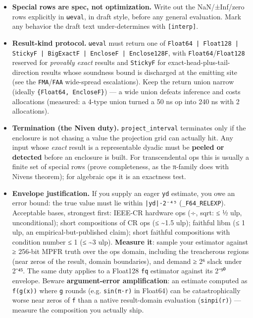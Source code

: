 \begin{itemize}
\item[1. ] \textbf{Special rows are spec, not optimization.} Write out the NaN/±Inf/zero rows explicitly in \texttt{ωeval}, in draft style, before any general evaluation. Mark any behavior the draft text under-determines with \texttt{[interp]}.


\item[2. ] \textbf{Result-kind protocol.} \texttt{ωeval} must return one of \texttt{Float64 | Float128 | StickyF | BigExactF | EncloseF | Enclose128F}, with \texttt{Float64}/\texttt{Float128} reserved for \emph{provably exact} results and \texttt{StickyF} for exact-head-plus-tail-direction results whose soundness bound is discharged at the emitting site (see the \texttt{FMA}/\texttt{FAA} wide-spread escalations). Keep the return union narrow (ideally \texttt{\{Float64, EncloseF\}}) — a wide union defeats inference and costs allocations (measured: a 4-type union turned a 50 ns op into 240 ns with 2 allocations).


\item[3. ] \textbf{Termination (the Niven duty).} \texttt{project\_interval} terminates only if the enclosure is not chasing a value the projection grid can actually hit. Any input whose \emph{exact} result is a representable dyadic must be \textbf{peeled or detected} before an enclosure is built. For transcendental ops this is usually a finite set of special rows (prove completeness, as the π-family does with Niven{\textquotesingle}s theorem); for algebraic ops it is an exactness test.


\item[4. ] \textbf{Envelope justification.} If you supply an eager \texttt{yd} estimate, you owe an error bound: the true value must lie within \texttt{|yd|·2⁻⁴⁵} (\texttt{\_F64\_RELEXP}). Acceptable bases, strongest first: IEEE-CR hardware ops (÷, sqrt: ≤ ½ ulp, unconditional); short compositions of CR ops (≤ {\textasciitilde}1.5 ulp); faithful libm (≤ 1 ulp, an empirical-but-published claim); short faithful compositions with condition number ≤ 1 (≤ {\textasciitilde}3 ulp). \textbf{Measure it}: sample your estimator against ≥ 256-bit MPFR truth over the op{\textquotesingle}s domain, including the treacherous regions (near zeros of the result, domain boundaries), and demand ≥ 2⁶ slack under 2⁻⁴⁵. The same duty applies to a Float128 \texttt{fq} estimator against its 2⁻⁹⁰ envelope. Beware \textbf{argument-error amplification}: an estimate computed as \texttt{f(g(x))} where \texttt{g} rounds (e.g. \texttt{sin(π·r)} in Float64) can be catastrophically worse near zeros of \texttt{f} than a native result-domain evaluation (\texttt{sinpi(r)}) — measure the composition you actually ship.



\end{itemize}
